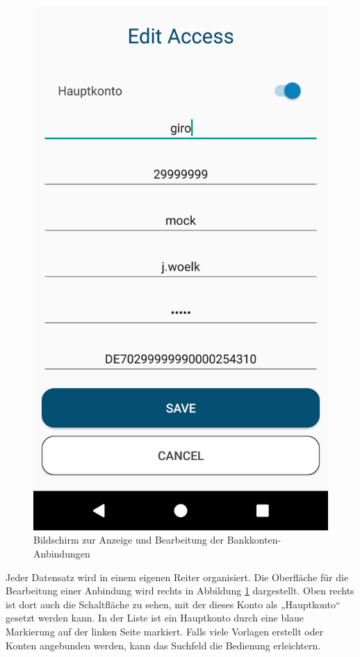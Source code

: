 \begin{figure}[h]
\begin{minipage}[b]{0.45\textwidth}
  \end{minipage}
  \begin{minipage}[b]{0.45\textwidth}
    \includegraphics[width=\textwidth]{bilder/4_appMainAccount.png}
  \end{minipage}
  \caption{Bildschirm zur Anzeige und Bearbeitung der Bankkonten-Anbindungen}
  \label{fig:app-accounts}
\end{figure}

Jeder Datensatz wird in einem eigenen Reiter organisiert. Die Oberfläche für die Bearbeitung einer Anbindung wird rechts in Abbildung \ref{fig:app-accounts} dargestellt. Oben rechts ist dort auch die Schaltfläche zu sehen, mit der dieses Konto als „Hauptkonto“ gesetzt werden kann. In der Liste ist ein Hauptkonto durch eine blaue Markierung auf der linken Seite markiert. Falls viele Vorlagen erstellt oder Konten angebunden werden, kann das Suchfeld die Bedienung erleichtern. 

